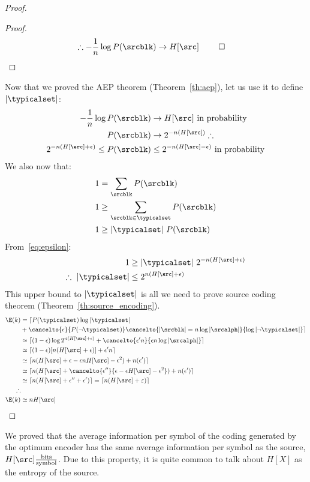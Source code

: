 \begin{proof}
\begin{proof}
\begin{align}
			\therefore -\frac{1}{n}\log P(\srcblk) &\to H[\src]~\qed
		\end{align}
	\end{proof}
		Now that we proved the \ac{AEP} theorem (Theorem~\ref{th:aep}), let us use it to define \(|\typicalset|\):
		\begin{align}
			-\frac{1}{n} \log P (&\srcblk)\to H[\src] \text{ in probability}\\
			P (&\srcblk) \to 2 ^{-n(H[\src])} \therefore\\
			2 ^{-n(H[\src] + \epsilon)}\leq P (&\srcblk)\leq 2 ^{-n(H[\src] - \epsilon)} \text{ in probability}\label{eq:epsilon}
		\end{align}
		We also now that:
		\begin{align}
			1 &= \sum_{\srcblk} P(\srcblk)\\
			1 &\geq \sum_{\srcblk \in \typicalset}P(\srcblk)\\
			1 &\geq |\typicalset|~ P(\srcblk)
		\end{align}
		From~\eqref{eq:epsilon}:
		\begin{align}
			1 &\geq |\typicalset|~ 2 ^{-n(H[\src] + \epsilon)}\\
			\therefore~ |\typicalset| &\leq 2 ^{n(H[\src] + \epsilon)}\label{eq:typical_upperbound}
		\end{align}
		This upper bound to \(|\typicalset|\) is all we need to prove source coding theorem (Theorem~\ref{th:source_encoding}).
		\begin{align}
			\E(k) &= \lceil P(\typicalset)\log|\typicalset|  \nonumber \\
			&+ \cancelto{\epsilon}{P(\neg \typicalset)} \cancelto{|\srcblk|=n \log |\srcalph|}{\log |\neg \typicalset|} \rceil \\
			&\simeq \lceil (1-\epsilon)\log 2^{n(H[\src]+\epsilon)} + \cancelto{\epsilon' n}{\epsilon n \log |\srcalph|}\rceil\\
			&\simeq \lceil (1-\epsilon)[n(H[\src]+\epsilon)] + \epsilon' n \rceil\\
			&\simeq \lceil n(H[\src]+\epsilon - \epsilon n H[\src] - \epsilon^2) + n (\epsilon')\rceil\\
			&\simeq \lceil n(H[\src]+\cancelto{\epsilon''}{\epsilon - \epsilon H[\src] - \epsilon^2}) +  n (\epsilon')\rceil\\
			&\simeq \lceil n(H[\src]+\epsilon''+\epsilon')\rceil = \lceil n(H[\src]+\varepsilon)\rceil\\
			\therefore \nonumber\\
			\E(k) &\simeq n H[\src] \qedhere
		\end{align}
	\end{proof}
	We proved that the average information per symbol of the coding generated by the optimum encoder has the same average information per symbol as the source, \(H[\src]\frac{\text{bits}}{\text{symbol}}\). Due to this property, it is quite common to talk about \(H[X]\) as the entropy of the source.
